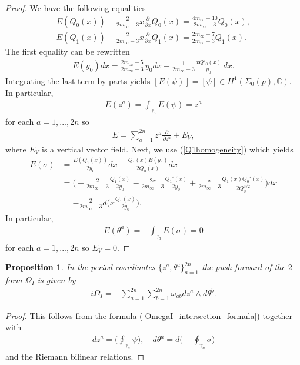 \documentclass[a4paper,12pt,reqno]{amsart}
\newcounter{counter2}
\numberwithin{equation}{section}
\numberwithin{counter2}{section}
\newcounter{counter3}
\newtheorem{prop}[counter2]{Proposition}
\begin{document}
\begin{proof}
We have the following equalities
\begin{align}
E(Q_0(x)) + \frac{2}{2m_\infty-3}x\frac{\partial}{\partial x}Q_0(x) = \frac{4m_\infty-10}{2m_\infty-3}Q_0(x), \\
E(Q_1(x)) + \frac{2}{2m_\infty-3}x\frac{\partial}{\partial x}Q_1(x) = \frac{2m_\infty-7}{2m_\infty-3}Q_1(x). \label{Q1homogeneity}
\end{align}
The first equality can be rewritten
\begin{align}
E(y_0)dx = \frac{2m_\infty-5}{2m_\infty -3} \, y_0 dx - \frac{1}{2m_\infty-3} \frac{xQ'_0(x)}{y_0} \, dx. 
\end{align}
Integrating the last term by parts yields $[E(\psi)] = [\psi] \in H^1(\Sigma_0(p),\mathbb{C})$.  In particular,   
\begin{align}
E(z^a) = \int_{\gamma_{a}} E(\psi) = z^a
\end{align}
for each $a = 1,...,2n$ so 
\begin{align}
E = \sum_{a=1}^{2n} z^a\frac{\partial}{\partial z^a} + E_V,  
\end{align}
where $E_V$ is a vertical vector field.  Next,  we use (\ref{Q1homogeneity}) which yields
\begin{align}
E(\sigma) &= \frac{E(Q_1(x))}{2y_0}dx - \frac{Q_1(x)E(y_0)}{2Q_0(x)}dx \nonumber \\ &= \Bigg(-\frac{2}{2m_\infty-3}\frac{Q_1(x)}{2y_0} - \frac{2x}{2m_\infty-3}\frac{Q_1'(x)}{2y_0} + \frac{x}{2m_\infty-3}\frac{Q_1(x)Q_0'(x)}{2Q_0^{3/2}}\Bigg)dx \nonumber \\
&= -\frac{2}{2m_\infty-3}d\Bigg(x\frac{Q_1(x)}{2y_0}\Bigg). 
\end{align}
 In particular,   
\begin{align}
E(\theta^a) = -\int_{\gamma_{a}} E(\sigma) = 0
\end{align}
for each $a = 1,...,2n$ so $E_V = 0$.  
\end{proof}
\begin{prop}\label{Omega_I_period}
In the period coordinates $\{z^a,\theta^a\}_{a=1}^{2n}$ the push-forward of the $2$-form $\Omega_I$ is given by
\begin{align}
i\Omega_I = -\sum_{a=1}^{2n} \sum_{b=1}^{2n} \omega_{ab}dz^{a} \wedge d\theta^{b}.  
\end{align}
\end{prop}
\begin{proof}
This follows from the formula (\ref{OmegaI_intersection_formula}) together with 
\begin{align}
dz^{a} = \bigg(\oint_{\gamma_{a}} \psi \bigg) ,  \quad d\theta^{a} = d\bigg(-\oint_{\gamma_{a}} \sigma \bigg) 
\end{align}
and the Riemann bilinear relations.  
\end{proof}
\end{document}
